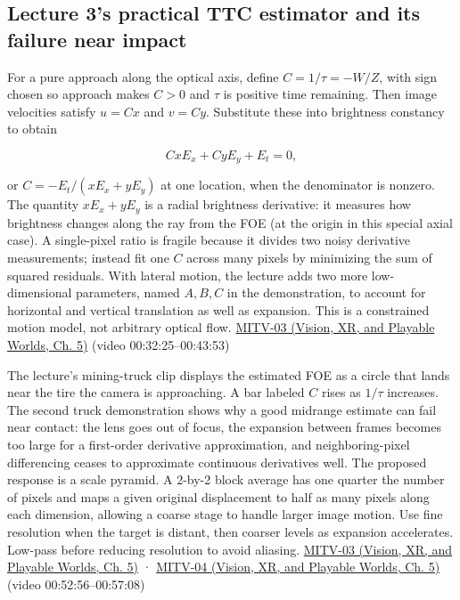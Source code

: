 \subsection{Lecture 3's practical TTC estimator and its failure near impact}\label{04-visual-computing-ii-ch030-lecture-3s-practical-ttc-estimator-and-its-failure-near-impact}

\hypertarget{04-visual-computing-ii-ch030-lecture-3s-practical-ttc-estimator-and-its-failure-near-impact}{}

For a pure approach along the optical axis, define \(C=1/\tau=-W/Z\), with sign chosen so approach makes \(C>0\) and \(\tau\) is positive time remaining. Then image velocities satisfy \(u=Cx\) and \(v=Cy\). Substitute these into brightness constancy to obtain

\[
CxE_x+CyE_y+E_t=0,
\]

or \(C=-E_t/(xE_x+yE_y)\) at one location, when the denominator is nonzero. The quantity \(xE_x+yE_y\) is a radial brightness derivative: it measures how brightness changes along the ray from the FOE (at the origin in this special axial case). A single-pixel ratio is fragile because it divides two noisy derivative measurements; instead fit one \(C\) across many pixels by minimizing the sum of squared residuals. With lateral motion, the lecture adds two more low-dimensional parameters, named \(A,B,C\) in the demonstration, to account for horizontal and vertical translation as well as expansion. This is a constrained motion model, not arbitrary optical flow. \href{../07-Vision-XR-and-Playable-Worlds/main.pdf\#nameddest=04-visual-computing-ii-ch036-mitv-03---time-to-contact-focus-of-expansion-direct-motion-vision-methods-noise-gain}{MITV-03 (Vision, XR, and Playable Worlds, Ch. 5)} (video 00:32:25--00:43:53)

The lecture's mining-truck clip displays the estimated FOE as a circle that lands near the tire the camera is approaching. A bar labeled \(C\) rises as \(1/\tau\) increases. The second truck demonstration shows why a good midrange estimate can fail near contact: the lens goes out of focus, the expansion between frames becomes too large for a first-order derivative approximation, and neighboring-pixel differencing ceases to approximate continuous derivatives well. The proposed response is a scale pyramid. A 2-by-2 block average has one quarter the number of pixels and maps a given original displacement to half as many pixels along each dimension, allowing a coarse stage to handle larger image motion. Use fine resolution when the target is distant, then coarser levels as expansion accelerates. Low-pass before reducing resolution to avoid aliasing. \href{../07-Vision-XR-and-Playable-Worlds/main.pdf\#nameddest=04-visual-computing-ii-ch036-mitv-03---time-to-contact-focus-of-expansion-direct-motion-vision-methods-noise-gain}{MITV-03 (Vision, XR, and Playable Worlds, Ch. 5)} · \href{../07-Vision-XR-and-Playable-Worlds/main.pdf\#nameddest=04-visual-computing-ii-ch036-mitv-04---fixed-optical-flow-optical-mouse-constant-brightness-assumption-closed-form-solution}{MITV-04 (Vision, XR, and Playable Worlds, Ch. 5)} (video 00:52:56--00:57:08)

